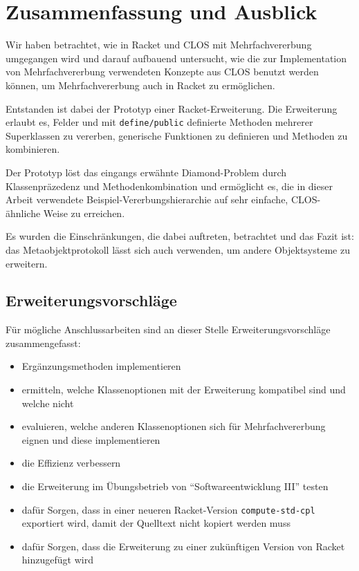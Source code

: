 \chapter{Zusammenfassung und Ausblick}
Wir haben betrachtet, wie in Racket und CLOS mit Mehrfachvererbung umgegangen wird und darauf aufbauend untersucht, wie die zur Implementation von Mehrfachvererbung verwendeten Konzepte aus CLOS benutzt werden können, um Mehrfachvererbung auch in Racket zu ermöglichen.

Entstanden ist dabei der Prototyp einer Racket-Erweiterung. Die Erweiterung erlaubt es, Felder und mit \texttt{define/public} definierte Methoden mehrerer Superklassen zu vererben, generische Funktionen zu definieren und Methoden zu kombinieren.

Der Prototyp löst das eingangs erwähnte Diamond-Problem durch Klassenpräzedenz und Methodenkombination und ermöglicht es, die in dieser Arbeit verwendete Beispiel-Vererbungshierarchie auf sehr einfache, CLOS-ähnliche Weise zu erreichen.

Es wurden die Einschränkungen, die dabei auftreten, betrachtet und das Fazit ist: das Metaobjektprotokoll lässt sich auch verwenden, um andere Objektsysteme zu erweitern.

\section{Erweiterungsvorschläge}

Für mögliche Anschlussarbeiten sind an dieser Stelle Erweiterungsvorschläge zusammengefasst:
\begin{itemize}
 \item Ergänzungsmethoden implementieren
 \item ermitteln, welche Klassenoptionen mit der Erweiterung kompatibel sind und welche nicht
 \item evaluieren, welche anderen Klassenoptionen sich für Mehrfachvererbung eignen und diese implementieren
 \item die Effizienz verbessern
 \item die Erweiterung im Übungsbetrieb von ``Softwareentwicklung III'' testen
 \item dafür Sorgen, dass in einer neueren Racket-Version \texttt{compute-std-cpl} exportiert wird, damit der Quelltext nicht kopiert werden muss
 \item dafür Sorgen, dass die Erweiterung zu einer zukünftigen Version von Racket hinzugefügt wird 
\end{itemize}
